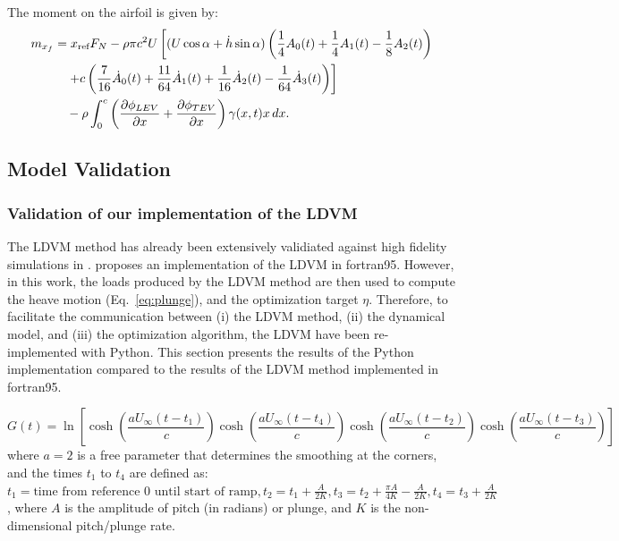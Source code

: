 \documentclass[a4paper,12pt]{article}
\begin{document}
The moment on the airfoil is given by:
\begin{align}
    m_{x_f} &=  x_{\text{ref}} F_N - \rho \pi c^2 U \left[ (U \cos\alpha + \dot{h} \sin\alpha) \left( \frac{1}{4}A_0(t) + \frac{1}{4}A_1(t) - \frac{1}{8}A_2(t) \right) \right. \notag \\
    &\quad \left. + c \left( \frac{7}{16} \dot{A}_0(t) + \frac{11}{64} \dot{A}_1(t) + \frac{1}{16} \dot{A}_2(t) - \frac{1}{64} \dot{A}_3(t) \right) \right] \notag \\
    &\quad - \rho \int_0^c \left( \frac{\partial \phi_{LEV}}{\partial x} + \frac{\partial \phi_{TEV}}{\partial x} \right) \gamma(x, t) x \, dx.
    \label{eq:moment}
\end{align}



\subsection{Model Validation}

\subsubsection{Validation of our implementation of the LDVM}

The LDVM method has already been extensively validiated against high fidelity simulations in \cite{ramesh2014discrete}.  \cite{ramesh2014discrete} proposes an implementation of the LDVM in fortran95. However, in this work, the loads produced by the LDVM method are then used to compute the heave motion (Eq.~\ref{eq:plunge}), and the optimization target $\eta$. Therefore, to facilitate the communication between (i) the LDVM method, (ii) the dynamical model, and (iii) the optimization algorithm, the LDVM have been re-implemented with Python. This section presents the results of the Python implementation compared to the results of the LDVM method implemented in fortran95. 




\begin{equation}
G(t) = \ln \left[ 
    \cosh\left( \frac{a U_\infty (t - t_1)}{c} \right)
    \cosh\left( \frac{a U_\infty (t - t_4)}{c} \right)
    \cosh\left( \frac{a U_\infty (t - t_2)}{c} \right)
    \cosh\left( \frac{a U_\infty (t - t_3)}{c} \right)
\right]
\end{equation}
where $a=2$ is a free parameter that determines the smoothing at the corners, and the times $t_1$ to $t_4$ are defined as:
$t_1 = \text{time from reference 0 until start of ramp}, t_2 = t_1 + \frac{A}{2K}, t_3 = t_2 + \frac{\pi A}{4K} - \frac{A}{2K},
    t_4 = t_3 + \frac{A}{2K}$, where $A$ is the amplitude of pitch (in radians) or plunge, and $K$ is the non-dimensional pitch/plunge rate.
\end{document}
